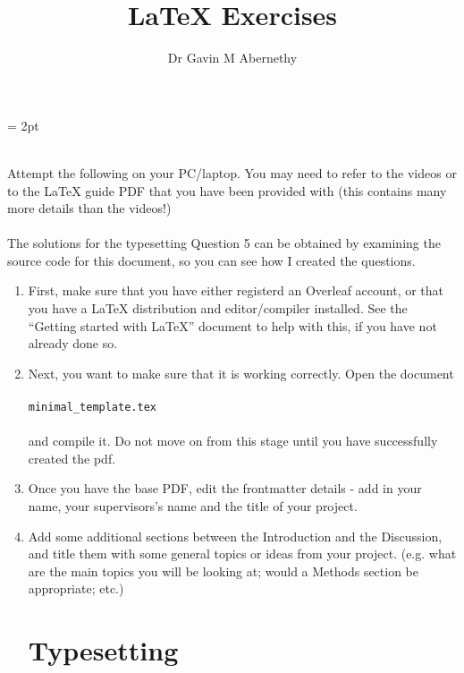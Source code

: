 \documentclass[12pt,fleqn]{article}
\title{\vspace{-6ex}LaTeX Exercises}
\author{Dr Gavin M Abernethy}
\date{}
\begin{document}
\font=2.5pt
\font= 2pt
\linespread{1.3}
\maketitle
~\\
Attempt the following on your PC/laptop. You may need to refer to the videos or to the LaTeX guide PDF that you have been provided with (this contains many more details than the videos!)\\
\\
The solutions for the typesetting Question 5 can be obtained by examining the source code for this document, so you can see how I created the questions.

\begin{enumerate}
	
	\section*{Essentials}
	\item First, make sure that you have either registerd an Overleaf account, or that you have a LaTeX distribution and editor/compiler installed. See the ``Getting started with LaTeX'' document to help with this, if you have not already done so.
	
	\item Next, you want to make sure that it is working correctly. Open the document\\~\\
	\verb!minimal_template.tex!\\~\\and compile it. Do not move on from this stage until you have successfully created the pdf. 
	
	\item Once you have the base PDF, edit the frontmatter details - add in your name, your supervisors's name and the title of your project.
	
	\item Add some additional sections between the Introduction and the Discussion, and title them with some general topics or ideas from your project. (e.g. what are the main topics you will be looking at; would a Methods section be appropriate; etc.)
	
	\newpage
	\section*{Typesetting}
	

\end{enumerate}
\end{document}
